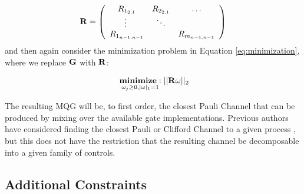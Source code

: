 \documentclass[aps,nofootinbib,pra,notitlepage,twocolumn]{revtex4-1}
\begin{document}
\begin{equation}\label{eq:vectorized_off_diagonal}
	\bold{R} = \left(\begin{array}{cccc}
		R_{1_{2,1}} & R_{2_{2,1}} & \ldots   \\ 
		\vdots\ & \ddots &    \\
		R_{1_{n-1,n-1}} &  &  R_{m_{n-1,n-1}} \\ 
	\end{array} 	
	\right)
\end{equation}
and then again consider the minimization problem in Equation \ref{eq:minimization}, where we replace $\bold{G}$ with $\bold{R}$:

\begin{equation}\label{eq:minimization_diagonal}
  \begin{split}
    &\underset{\omega_j\geq0, |\omega|_1=1}{\textbf{minimize}: } ||\bold{R}\omega||_2\\
  \end{split}
\end{equation}

The resulting MQG will be, to first order, the closest Pauli Channel that can be produced by mixing over the available gate implementations. Previous authors have considered finding the closest Pauli or Clifford Channel to a given process \cite{Magesan2013}, but this does not have the restriction that the resulting channel be decomposable into a given family of controls. 


\subsection{Additional Constraints}
\end{document}
